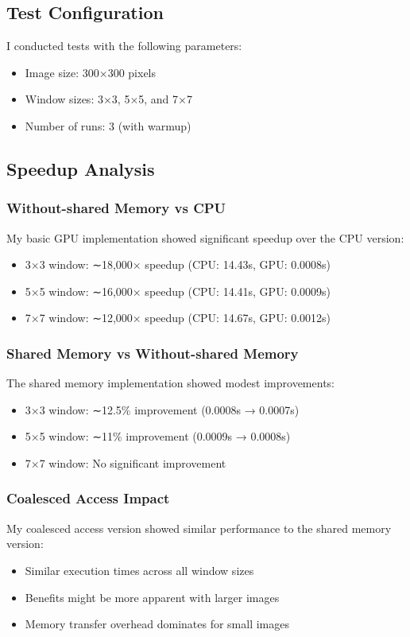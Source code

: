 \documentclass[12pt]{article}
\begin{document}
\subsection{Test Configuration}
I conducted tests with the following parameters:
\begin{itemize}
    \item Image size: 300×300 pixels
    \item Window sizes: 3×3, 5×5, and 7×7
    \item Number of runs: 3 (with warmup)
\end{itemize}

\subsection{Speedup Analysis}
\subsubsection{Without-shared Memory vs CPU}
My basic GPU implementation showed significant speedup over the CPU version:
\begin{itemize}
    \item 3×3 window: ∼18,000× speedup (CPU: 14.43s, GPU: 0.0008s)
    \item 5×5 window: ∼16,000× speedup (CPU: 14.41s, GPU: 0.0009s)
    \item 7×7 window: ∼12,000× speedup (CPU: 14.67s, GPU: 0.0012s)
\end{itemize}

\subsubsection{Shared Memory vs Without-shared Memory}
The shared memory implementation showed modest improvements:
\begin{itemize}
    \item 3×3 window: ∼12.5\% improvement (0.0008s → 0.0007s)
    \item 5×5 window: ∼11\% improvement (0.0009s → 0.0008s)
    \item 7×7 window: No significant improvement
\end{itemize}

\subsubsection{Coalesced Access Impact}
My coalesced access version showed similar performance to the shared memory version:
\begin{itemize}
    \item Similar execution times across all window sizes
    \item Benefits might be more apparent with larger images
    \item Memory transfer overhead dominates for small images
\end{itemize}
\end{document}
